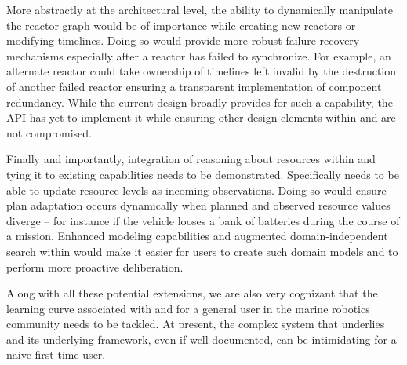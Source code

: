 More abstractly at the architectural level, the ability to dynamically
manipulate the reactor graph would be of importance while creating new
reactors or modifying timelines. Doing so would provide more robust
failure recovery mechanisms especially after a reactor has failed to
synchronize. For example, an alternate reactor could take ownership of
timelines left invalid by the destruction of another failed reactor
ensuring a transparent implementation of component redundancy. While
the current design broadly provides for such a capability, the \rx API
has yet to implement it while ensuring other design elements within
\rx and \eu are not compromised.

Finally and importantly, integration of reasoning about resources
within \rx and tying it to existing \eu capabilities needs to be
demonstrated. Specifically \rx needs to be able to update resource
levels as incoming observations.  Doing so would ensure plan
adaptation occurs dynamically when planned and observed resource
values diverge -- for instance if the vehicle looses a bank of
batteries during the course of a mission.  Enhanced modeling
capabilities and augmented domain-independent search within \eu would
make it easier for \rx users to create such domain models and to
perform more proactive deliberation.

Along with all these potential extensions, we are also very cognizant
that the learning curve associated with \rx and \eu for a general user
in the marine robotics community needs to be tackled. At present, the
complex system that underlies \rx and its underlying framework, even
if well documented, can be intimidating for a naive first time user.






